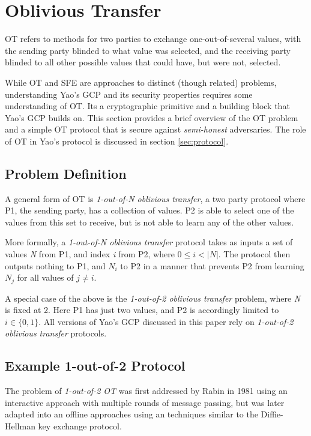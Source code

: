 \section{Oblivious Transfer}
\label{sec:ot}

\ac{OT} refers to methods for two parties to exchange one-out-of-several values, with the sending party blinded to what value was selected, and the receiving party blinded to all other possible values that could have, but were not, selected.

While \ac{OT} and \ac{SFE} are approaches to distinct (though related) problems, understanding Yao's \ac{GCP} and its security properties requires some understanding of \ac{OT}. Its a cryptographic primitive and a building block that Yao's \ac{GCP} builds on.  This section provides a brief overview of the \ac{OT} problem and a simple \ac{OT} protocol that is secure against \emph{semi-honest} adversaries. The role of \ac{OT} in Yao's protocol is discussed in section \ref{sec:protocol}.

\subsection{Problem Definition}

A general form of \ac{OT} is \emph{1-out-of-N oblivious transfer}, a two party protocol where \ac{P1}, the sending party, has a collection of values. \ac{P2} is able to select one of the values from this set to receive, but is not able to learn any of the other values.

More formally, a \emph{1-out-of-N oblivious transfer} protocol takes as inputs a set of values \emph{N} from \ac{P1}, and index \emph{i} from \ac{P2}, where
$0 \leq i < |N|$. The protocol then outputs nothing to \ac{P1}, and $N_i$ to \ac{P2} in a manner that prevents \ac{P2} from learning $N_j$ for all values of $j \neq i$.

A special case of the above is the \emph{1-out-of-2 oblivious transfer} problem, where \emph{N} is fixed at 2.  Here \ac{P1} has just two values, and \ac{P2} is accordingly limited to $i \in \{0, 1\}$.  All versions of Yao's \ac{GCP} discussed in this paper rely on \emph{1-out-of-2 oblivious transfer} protocols.

\subsection{Example 1-out-of-2 Protocol}

The problem of \emph{1-out-of-2 \ac{OT}} was first addressed by Rabin\cite{rabin2005exchange} in 1981 using an interactive approach with multiple rounds of message passing, but was later adapted into an offline approaches using an techniques similar to the Diffie-Hellman key exchange protocol\cite{diffie1976new}.

